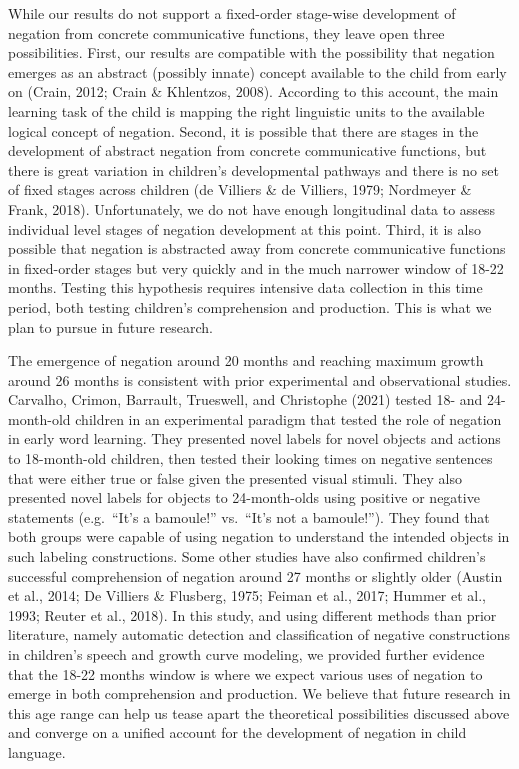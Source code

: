 \documentclass[
  man,floatsintext]{apa6}
\begin{document}
While our results do not support a fixed-order stage-wise development of negation from concrete communicative functions, they leave open three possibilities. First, our results are compatible with the possibility that negation emerges as an abstract (possibly innate) concept available to the child from early on (Crain, 2012; Crain \& Khlentzos, 2008). According to this account, the main learning task of the child is mapping the right linguistic units to the available logical concept of negation. Second, it is possible that there are stages in the development of abstract negation from concrete communicative functions, but there is great variation in children's developmental pathways and there is no set of fixed stages across children (de Villiers \& de Villiers, 1979; Nordmeyer \& Frank, 2018). Unfortunately, we do not have enough longitudinal data to assess individual level stages of negation development at this point. Third, it is also possible that negation is abstracted away from concrete communicative functions in fixed-order stages but very quickly and in the much narrower window of 18-22 months. Testing this hypothesis requires intensive data collection in this time period, both testing children's comprehension and production. This is what we plan to pursue in future research.

The emergence of negation around 20 months and reaching maximum growth around 26 months is consistent with prior experimental and observational studies. Carvalho, Crimon, Barrault, Trueswell, and Christophe (2021) tested 18- and 24-month-old children in an experimental paradigm that tested the role of negation in early word learning. They presented novel labels for novel objects and actions to 18-month-old children, then tested their looking times on negative sentences that were either true or false given the presented visual stimuli. They also presented novel labels for objects to 24-month-olds using positive or negative statements (e.g.~``It's a bamoule!'' vs.~``It's not a bamoule!''). They found that both groups were capable of using negation to understand the intended objects in such labeling constructions. Some other studies have also confirmed children's successful comprehension of negation around 27 months or slightly older (Austin et al., 2014; De Villiers \& Flusberg, 1975; Feiman et al., 2017; Hummer et al., 1993; Reuter et al., 2018). In this study, and using different methods than prior literature, namely automatic detection and classification of negative constructions in children's speech and growth curve modeling, we provided further evidence that the 18-22 months window is where we expect various uses of negation to emerge in both comprehension and production. We believe that future research in this age range can help us tease apart the theoretical possibilities discussed above and converge on a unified account for the development of negation in child language.
\end{document}
